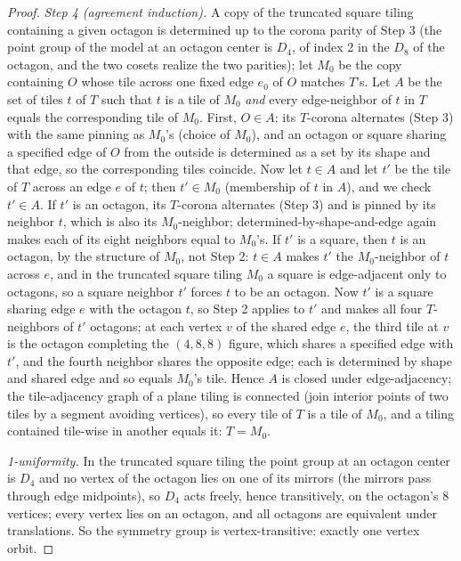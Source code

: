 \documentclass[11pt]{article}
\theoremstyle{definition}
\begin{document}
\begin{proof}
\emph{Step 4 (agreement induction).} A copy of the truncated square tiling containing a
given octagon is determined up to the corona parity of Step 3 (the point group of the
model at an octagon center is $D_4$, of index 2 in the $D_8$ of the octagon, and the two
cosets realize the two parities); let $M_0$ be the copy containing $O$ whose tile across
one fixed edge $e_0$ of $O$ matches $T$'s. Let $A$ be the set of tiles $t$ of $T$ such
that $t$ is a tile of $M_0$ \emph{and} every edge-neighbor of $t$ in $T$ equals the
corresponding tile of $M_0$. First, $O \in A$: its $T$-corona alternates (Step 3) with
the same pinning as $M_0$'s (choice of $M_0$), and an octagon or square sharing a
specified edge of $O$ from the outside is determined as a set by its shape and that
edge, so the corresponding tiles coincide. Now let $t \in A$ and let $t'$ be the tile of
$T$ across an edge $e$ of $t$; then $t' \in M_0$ (membership of $t$ in $A$), and we
check $t' \in A$. If $t'$ is an octagon, its $T$-corona alternates (Step 3) and is
pinned by its neighbor $t$, which is also its $M_0$-neighbor; determined-by-shape-and-edge
again makes each of its eight neighbors equal to $M_0$'s. If $t'$ is a square, then $t$
is an octagon, by the structure of $M_0$, not Step 2: $t \in A$ makes $t'$ the
$M_0$-neighbor of $t$ across $e$, and in the truncated square tiling $M_0$ a square is
edge-adjacent only to octagons, so a square neighbor $t'$ forces $t$ to be an octagon.
Now $t'$ is a square sharing edge $e$ with the octagon $t$, so Step 2 applies to $t'$ and
makes all four $T$-neighbors of $t'$ octagons; at each vertex $v$ of the shared edge $e$,
the third tile at $v$ is the octagon completing the $(4,8,8)$ figure, which shares a
specified edge with $t'$, and the fourth neighbor shares the opposite edge; each is
determined by shape and shared edge and so equals $M_0$'s tile. Hence $A$ is closed under edge-adjacency; the tile-adjacency graph
of a plane tiling is connected (join interior points of two tiles by a segment avoiding
vertices), so every tile of $T$ is a tile of $M_0$, and a tiling contained tile-wise in
another equals it: $T = M_0$.

\emph{1-uniformity.} In the truncated square tiling the point group at an octagon center
is $D_4$ and no vertex of the octagon lies on one of its mirrors (the mirrors pass
through edge midpoints), so $D_4$ acts freely, hence transitively, on the octagon's $8$
vertices; every vertex lies on an octagon, and all octagons are equivalent under
translations. So the symmetry group is vertex-transitive: exactly one vertex orbit.
\end{proof}
\end{document}
